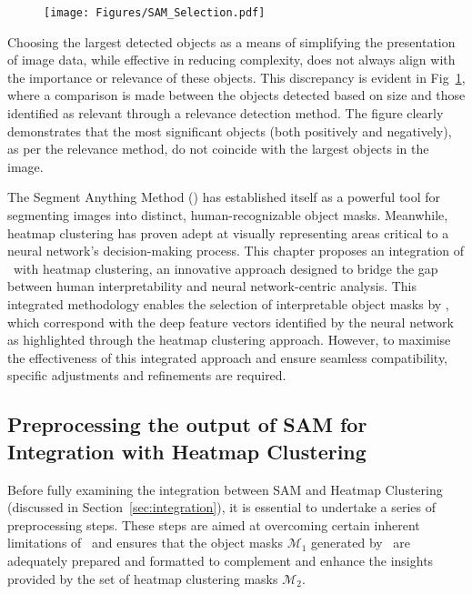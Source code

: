 \begin{figure}[ht!]
\begin{center}
\texttt{[image: Figures/SAM\_Selection.pdf]}
\end{center}
\caption{}
\label{Fig:SAM_nor_right}
\end{figure} 

Choosing the largest detected objects as a means of simplifying the presentation of image data, while effective in reducing complexity, does not always align with the importance or relevance of these objects. This discrepancy is evident in Fig~\ref{Fig:SAM_nor_right}, where a comparison is made between the objects detected based on size and those identified as relevant through a relevance detection method. The figure clearly demonstrates that the most significant objects (both positively and negatively), as per the relevance method, do not coincide with the largest objects in the image.


The Segment Anything Method (\SAM) has established itself as a powerful tool for segmenting images into distinct, human-recognizable object masks. Meanwhile, heatmap clustering has proven adept at visually representing areas critical to a neural network's decision-making process. This chapter proposes an integration of \SAM\ with heatmap clustering, an innovative approach designed to bridge the gap between human interpretability and neural network-centric analysis. This integrated methodology enables the selection of interpretable object masks by \SAM, which correspond with the deep feature vectors identified by the neural network as highlighted through the heatmap clustering approach. However, to maximise the effectiveness of this integrated approach and ensure seamless compatibility, specific adjustments and refinements are required.

\subsection{Preprocessing the output of SAM for Integration with Heatmap Clustering}

Before fully examining the integration between SAM and Heatmap Clustering (discussed in Section~\ref{sec:integration}), it is essential to undertake a series of preprocessing steps. These steps are aimed at overcoming certain inherent limitations of \SAM\ and ensures that the object masks $\mathcal{M}_1$ generated by \SAM\ are adequately prepared and formatted to complement and enhance the insights provided by the set of heatmap clustering masks $\mathcal{M}_2$.



